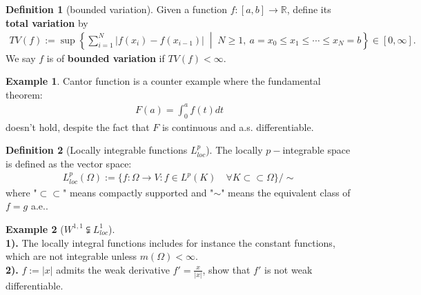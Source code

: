 \documentclass[a4paper,11pt,fleqn]{book}
\theoremstyle{definition}
\newtheorem{definition}{Definition}[section]
\newtheorem*{example}{Example}
\theoremstyle{remark}
\begin{document}
\begin{definition}[bounded variation]
    Given a function $f : [a, b] \to \mathbb{R}$, define its \textbf{total variation} by
    \begin{align*}
        TV(f) := \sup\left\{ \sum_{i=1}^N |f(x_i) - f(x_{i-1})| \;\middle|\; N \geq 1,\ a = x_0 \leq x_1 \leq \cdots \leq x_N = b \right\} \in [0, \infty].
    \end{align*}
    We say $f$ is of \textbf{bounded variation} if $TV(f) < \infty$.
\end{definition}


\begin{example}
Cantor function is a counter example where the fundamental theorem:
\begin{align*}
	F(a) = \int_0^a f(t) dt
\end{align*}	
doesn't hold, despite the fact that $F$ is continuous and a.s. differentiable.
\end{example}

\begin{definition}[Locally integrable functions $L^p_{loc}$]
	The locally $p-$integrable space is defined as the vector space:
	\begin{align*}
		L^p_{loc}(\Omega):= 
		\bigg\{ f : \Omega \rightarrow V: f \in L^p(K) \quad \forall K \subset \subset \Omega \bigg\} \slash \sim
	\end{align*}
	where "$\subset\subset$" means compactly supported and "$\sim$" means the equivalent class of $f = g$ a.e..
\end{definition}

\begin{example}[$W^{1,1} \subsetneqq L^1_{loc}$]
\quad\\
\textbf{1).} The locally integral functions includes for instance the constant functions, which are not integrable unless $m(\Omega)< \infty$.\\
\textbf{2).}
	$f:= |x|$ admits the weak derivative $f'= \frac{x}{|x|}$, show that $f'$ is not weak differentiable. 
\end{example}
\end{document}
